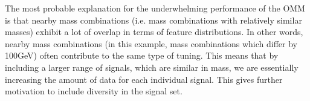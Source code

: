 The most probable explanation for the underwhelming performance of the \ac{OMM} is that nearby mass combinations (i.e. mass combinations with 
relatively similar masses) exhibit a lot of overlap in terms of feature distributions. In other words, nearby mass combinations (in this example, mass combinations which 
differ by 100GeV) often contribute to the same type of tuning. This means that by including a larger range of signals, which are similar in mass, we are 
essentially increasing the amount of data for each individual signal. This gives further motivation to include diversity in the signal set.